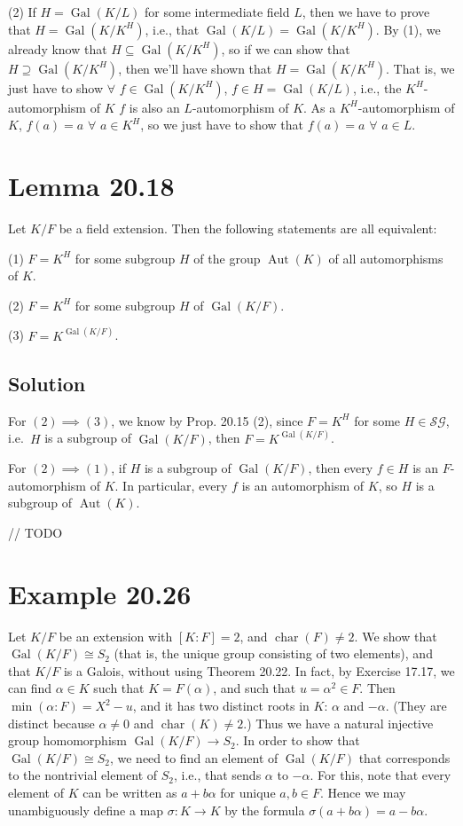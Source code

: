 \documentclass[fleqn]{article}
\DeclareMathOperator{\Gal}{Gal}
\DeclareMathOperator{\Aut}{Aut}
\DeclareMathOperator{\Char}{char}
\begin{document}
        $ $ \\
        \noindent
        (2) If $H = \Gal(K/L)$ for some intermediate field $L$, then we have to prove that $H = \Gal\left(K/K^H\right)$, i.e., that $\Gal(K/L) = \Gal\left(K/K^H\right)$.  By (1), we already know that $H \subseteq \Gal\left(K/K^H\right)$, so if we can show that $H \supseteq \Gal\left(K/K^H\right)$, then we'll have shown that $H = \Gal\left(K/K^H\right)$.  That is, we just have to show $\forall$ $f \in \Gal\left(K/K^H\right)$, $f \in H = \Gal(K/L)$, i.e., the $K^H$-automorphism of $K$ $f$ is also an $L$-automorphism of $K$.  As a $K^H$-automorphism of $K$, $f(a) = a$ $\forall$ $a \in K^H$, so we just have to show that $f(a) = a$ $\forall$ $a \in L$.
    
    \section{Lemma 20.18}
    Let $K/F$ be a field extension.  Then the following statements are all equivalent:
    
    (1) $F = K^H$ for some subgroup $H$ of the group $\Aut(K)$ of all automorphisms of $K$.
    
    (2) $F = K^H$ for some subgroup $H$ of $\Gal(K/F)$.
    
    (3) $F = K^{\Gal(K/F)}$.
        
        \subsection{Solution}
        For $(2) \implies (3)$, we know by Prop. 20.15 (2), since $F = K^H$ for some $H \in \mathcal{SG}$, i.e.\ $H$ is a subgroup of $\Gal(K/F)$, then $F = K^{\Gal(K/F)}$.
        
        For $(2) \implies (1)$, if $H$ is a subgroup of $\Gal(K/F)$, then every $f \in H$ is an $F$-automorphism of $K$.  In particular, every $f$ is an automorphism of $K$, so $H$ is a subgroup of $\Aut(K)$.
        
        // TODO
    
    \section{Example 20.26}
    Let $K/F$ be an extension with $[K : F] = 2$, and $\Char(F) \neq 2$.  We show that $\Gal(K/F) \cong S_2$ (that is, the unique group consisting of two elements), and that $K/F$ is a Galois, without using Theorem 20.22.  In fact, by Exercise 17.17, we can find $\alpha \in K$ such that $K = F(\alpha)$, and such that $u = \alpha^2 \in F$.  Then $\min(\alpha : F) = X^2 - u$, and it has two distinct roots in $K$: $\alpha$ and $-\alpha$.  (They are distinct because $\alpha \neq 0$ and $\Char(K) \neq 2$.)  Thus we have a natural injective group homomorphism $\Gal(K/F) \to S_2$.  In order to show that $\Gal(K/F) \cong S_2$, we need to find an element of $\Gal(K/F)$ that corresponds to the nontrivial element of $S_2$, i.e., that sends $\alpha$ to $-\alpha$.  For this, note that every element of $K$ can be written as $a + b\alpha$ for unique $a, b \in F$.  Hence we may unambiguously define a map $\sigma: K \to K$ by the formula $\sigma(a + b\alpha) = a - b\alpha$.
        
\end{document}
